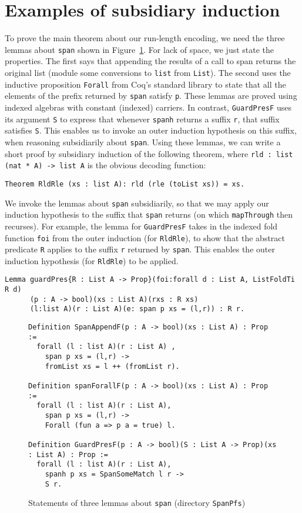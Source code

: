 \documentclass[a4paper,USenglish]{lipics-v2021}
\begin{document}
\section{Examples of subsidiary induction}
\label{sec:examplesi}

To prove the main theorem about our run-length encoding, we need
the three lemmas about \verb|span| shown in Figure~\ref{fig:spanlem}.
For lack of space, we just state the properties.  The first says that
appending the results of a call to span returns the original list
(module some conversions to \verb|list| from \verb|List|).  The second
uses the inductive proposition \verb|Forall| from Coq's standard library to
state that all the elements of the prefix returned by \verb|span|
satisfy \verb|p|.  These lemmas are proved using indexed algebras with
constant (indexed) carriers.  In contrast, \verb|GuardPresF| uses its
argument \verb|S| to express that whenever \verb|spanh| returns a
suffix \verb|r|, that suffix satisfies \verb|S|.  This enables us to
invoke an outer induction hypothesis on this suffix, when reasoning
subsidiarily about \verb|span|.  Using these lemmas, we can write a
short proof by subsidiary induction of the following theorem, where
\verb|rld : list (nat * A) -> list A| is the obvious decoding
function:

\begin{verbatim}
Theorem RldRle (xs : list A): rld (rle (toList xs)) = xs.
\end{verbatim}

\noindent We invoke the lemmas about \verb|span| subsidiarily,
so that we may apply our induction hypothesis to the suffix
that \verb|span| returns (on which \verb|mapThrough| then recurses).
For example, the lemma for \verb|GuardPresF| takes in the
indexed fold function \verb|foi| from the outer induction (for \verb|RldRle|),
to show that the abstract predicate \verb|R| applies to the suffix
\verb|r| returned by \verb|span|.  This enables the outer induction
hypothesis (for \verb|RldRle|) to be applied.

\begin{verbatim}
Lemma guardPres{R : List A -> Prop}(foi:forall d : List A, ListFoldTi R d)
      (p : A -> bool)(xs : List A)(rxs : R xs)
      (l:list A)(r : List A)(e: span p xs = (l,r)) : R r.
\end{verbatim}

\begin{figure}
\begin{verbatim}
Definition SpanAppendF(p : A -> bool)(xs : List A) : Prop :=
  forall (l : list A)(r : List A) ,
    span p xs = (l,r) ->
    fromList xs = l ++ (fromList r).

Definition spanForallF(p : A -> bool)(xs : List A) : Prop :=
  forall (l : list A)(r : List A),
    span p xs = (l,r) ->
    Forall (fun a => p a = true) l.

Definition GuardPresF(p : A -> bool)(S : List A -> Prop)(xs : List A) : Prop :=
  forall (l : list A)(r : List A),
    spanh p xs = SpanSomeMatch l r ->
    S r.
\end{verbatim}
\caption{Statements of three lemmas about \texttt{span} (directory \texttt{SpanPfs})}
\label{fig:spanlem}
\end{figure}
\end{document}
